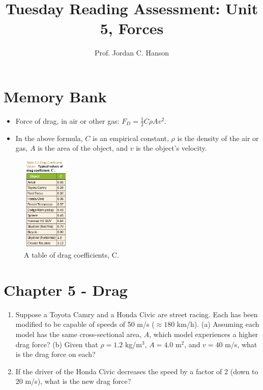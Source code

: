 \documentclass{article}
\begin{document}
\title{Tuesday Reading Assessment: Unit 5, Forces}
\author{Prof. Jordan C. Hanson}

\maketitle

\section{Memory Bank}

\begin{itemize}
\item Force of drag, in air or other gas: $F_D = \frac{1}{2}C \rho A v^2$.
\item In the above formula, $C$ is an empirical constant, $\rho$ is the density of the air or gas, $A$ is the area of the object, and $v$ is the object's velocity.
\end{itemize}
\begin{figure}[ht]
\centering
\includegraphics[width=0.2\textwidth]{drag.png}
\caption{\label{fig:drag} A table of drag coefficients, C.}
\end{figure}
\section{Chapter 5 - Drag}
\begin{enumerate}
\item Suppose a Toyota Camry and a Honda Civic are street racing.  Each has been modified to be capable of speeds of 50 m/s ($\approx 180$ km/h).  (a) Assuming each model has the same cross-sectional area, $A$, which model experiences a higher drag force? (b) Given that $\rho = 1.2$ kg/m$^3$, $A = 4.0$ m$^2$, and $v=40$ m/s, what is the drag force on each? \\ \vspace{2cm}
\item If the driver of the Honda Civic decreases the speed by a factor of 2 (down to $20$ m/s), what is the new drag force?
\end{enumerate}
\end{document}
